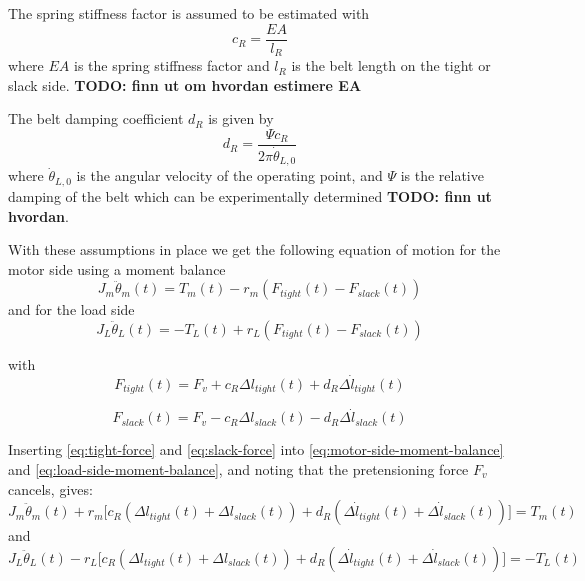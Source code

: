 The spring stiffness factor is assumed to be estimated with
\begin{equation}
	c_R = \frac{EA}{l_R}
	\label{eq:spring_stifness}
\end{equation}
where $EA$ is the spring stiffness factor and $l_R$ is the belt length on the tight or slack side.
\textbf{TODO: finn ut om hvordan estimere EA}

The belt damping coefficient $d_R$ is given by
\begin{equation}
	d_R = \frac{\Psi c_R}{2\pi\dot{\theta}_{L,0}}
	\label{eq:damping_coeff}
\end{equation}
where $\dot{\theta}_{L,0}$ is the angular velocity of the operating point, and $\Psi$ is the relative damping of the belt which can be experimentally determined \textbf{TODO: finn ut hvordan}.

With these assumptions in place we get the following equation of motion for the motor side using a moment balance
\begin{equation}
	J_m \ddot{\theta}_m(t) = T_m(t) - r_m (F_{tight}(t)-F_{slack}(t))
	\label{eq:motor-side-moment-balance}
\end{equation}
and for the load side
\begin{equation}
	J_L \ddot{\theta}_L(t) = -T_L(t) + r_L (F_{tight}(t)-F_{slack}(t))
	\label{eq:load-side-moment-balance}
\end{equation}

with
\begin{equation}
	F_{tight}(t) = F_v + c_R\Delta l_{tight}(t) + d_R \Delta\dot{l}_{tight}(t)
	\label{eq:tight-force}
\end{equation}

\begin{equation}
	F_{slack}(t) = F_v - c_R\Delta l_{slack}(t) - d_R \Delta\dot{l}_{slack}(t)
	\label{eq:slack-force}
\end{equation}

Inserting \autoref{eq:tight-force} and \autoref{eq:slack-force} into \autoref{eq:motor-side-moment-balance} and \autoref{eq:load-side-moment-balance}, and noting that the pretensioning force $F_v$ cancels, gives:
\begin{equation}
	J_m \ddot{\theta}_m(t) + r_m\bigl[c_R(\Delta l_{tight}(t) + \Delta l_{slack}(t)) + d_R(\Delta\dot{l}_{tight}(t) + \Delta\dot{l}_{slack}(t))\bigr] = T_m(t)
	\label{eq:motor-side-belt-compression}
\end{equation}
and
\begin{equation}
	J_L \ddot{\theta}_L(t) - r_L\bigl[c_R(\Delta l_{tight}(t) + \Delta l_{slack}(t)) + d_R(\Delta\dot{l}_{tight}(t) + \Delta\dot{l}_{slack}(t))\bigr] = -T_L(t)
	\label{eq:load-side-belt-compression}
\end{equation}

